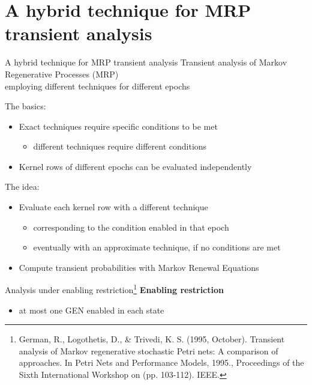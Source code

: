 
\section{A hybrid technique for MRP transient analysis}
  \begin{frame}{A hybrid technique for MRP transient analysis}
    Transient analysis of Markov Regenerative Processes (MRP)\\
    employing different techniques for different epochs
    
    \vspace{1em}
    The basics:
    \begin{itemize}
      \item Exact techniques require specific conditions to be met
      \begin{itemize}
        \item different techniques require different conditions
      \end{itemize}
      \item Kernel rows of different epochs can be evaluated independently
    \end{itemize}
    
    \vspace{1em}
    The idea:
    \begin{itemize}
      \item Evaluate each kernel row with a different technique
      \begin{itemize}
        \item corresponding to the condition enabled in that epoch
        \item eventually with an approximate technique, if no conditions are met
      \end{itemize}
      \item Compute transient probabilities with Markov Renewal Equations
    \end{itemize}
  \end{frame}
  
  \begin{frame}{Analysis under enabling restriction\footnote{German, R., Logothetis, D., \& Trivedi, K. S. (1995, October). Transient analysis of Markov regenerative stochastic Petri nets: A comparison of approaches. In Petri Nets and Performance Models, 1995., Proceedings of the Sixth International Workshop on (pp. 103-112). IEEE.}}
    \textbf{Enabling restriction}
    \begin{itemize}
      \item at most one GEN enabled in each state
    \end{itemize}
    
    \vspace{1em}
    \begin{center}\scalebox{0.8}{}\end{center}
  \end{frame}
  
